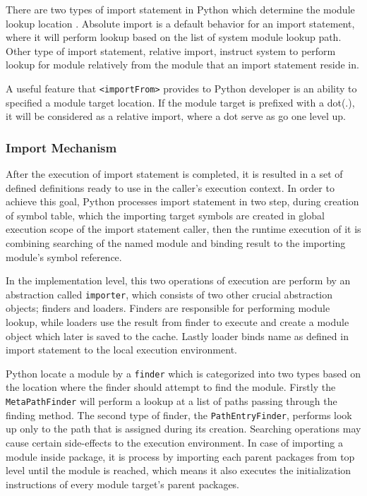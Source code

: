 There are two types of import statement in Python which determine the module lookup location \cite{pep328}. Absolute import is a default behavior for an import statement, where it will perform lookup based on the list of system module lookup path. Other type of import statement, relative import, instruct system to perform lookup for module relatively from the module that an import statement reside in.

A useful feature that \texttt{<importFrom>} provides to Python developer is an ability to specified a module target location. If the module target is prefixed with a dot(.), it will be considered as a relative import, where a dot serve as go one level up.


\subsubsection{Import Mechanism}

After the execution of import statement is completed, it is resulted in a set of defined definitions ready to use in the caller’s execution context.
In order to achieve this goal, Python processes import statement in two step, during creation of symbol table, which the importing target symbols are created in global execution scope of the import statement caller, then the runtime execution of it is combining searching of the named module and binding result to the importing module's symbol reference.

In the implementation level, this two operations of execution are perform by an abstraction called \texttt{importer}, which consists of two other crucial abstraction objects; finders and loaders.
Finders are responsible for performing module lookup, while loaders use the result from finder to execute and create a module object which later is saved to the cache.
Lastly loader binds name as defined in import statement to the local execution environment.

Python locate a module by a \texttt{finder} which is categorized into two types based on the location where the finder should attempt to find the module.
Firstly the \texttt{MetaPathFinder} will perform a lookup at a list of paths passing through the finding method.
The second type of finder, the \texttt{PathEntryFinder}, performs look up only to the path that is assigned during its creation.
Searching operations may cause certain side-effects to the execution environment. In case of importing a module inside package, it is process by importing each parent packages from top level until the module is reached, which means it also executes the initialization instructions of every module target's parent packages.

